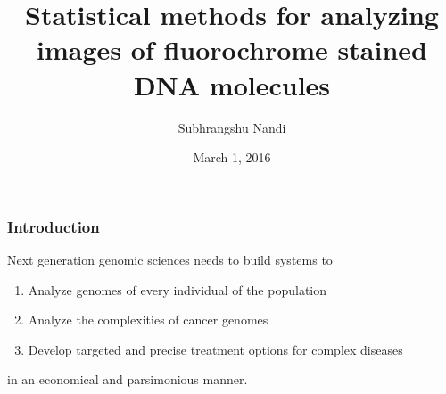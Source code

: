 \documentclass[10pt,dvipsnames,table]{beamer}
\title[Statistics for Fluoroscanning]{Statistical methods for analyzing images of fluorochrome stained DNA molecules}
\author{Subhrangshu Nandi}
\institute[Prelim exam]{Preliminary Exam \\
Department of Statistics \\
University of Wisconsin-Madison}
\date{March 1, 2016}
\begin{document}
\setlength{\baselineskip}{16truept}

\frame{\maketitle}




\begin{frame}
\frametitle{Introduction}
{\Large{
Next generation genomic sciences needs to build systems to
\begin{enumerate}
\item Analyze genomes of every individual of the population
\item Analyze the complexities of cancer genomes
\item Develop targeted and precise treatment options for complex diseases
\end{enumerate}
in an economical and parsimonious manner.
}}
\end{frame}
\end{document}
